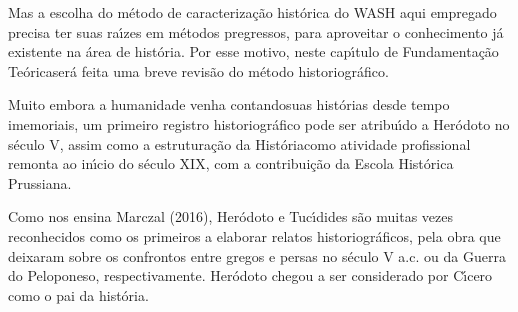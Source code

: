 \documentclass[
12pt,		%
openright,	%
twoside,  %
a4paper,			%
chapter=TITLE,		%
english,			%
french,				%
spanish,			%
brazil				%
]{USPSC-classe/USPSC}
\begin{document}
Mas a escolha do m\'etodo de caracteriza\c{c}\~ao hist\'orica do WASH aqui empregado precisa ter suas ra\'{\i}zes em m\'etodos pregressos, para aproveitar o conhecimento j\'a existente na \'area de hist\'oria. Por esse motivo, neste cap\'{\i}tulo de \textquotedbl Fundamenta\c{c}\~ao Te\'orica\textquotedbl  ser\'a feita uma breve revis\~ao do m\'etodo historiogr\'afico.


Muito embora a humanidade venha \textquotedbl contando\textquotedbl  suas hist\'orias desde tempo imemoriais, um primeiro registro historiogr\'afico pode ser atribu\'{\i}do a Her\'odoto no s\'eculo V, assim como a estrutura\c{c}\~ao da \textquotedbl Hist\'oria\textquotedbl  como atividade profissional remonta ao in\'{\i}cio do s\'eculo XIX, com a contribui\c{c}\~ao da Escola Hist\'orica Prussiana.


Como nos ensina  Marczal (2016),  Her\'odoto e Tuc\'{\i}dides s\~ao muitas vezes reconhecidos como os primeiros a elaborar relatos historiogr\'aficos, pela obra que deixaram sobre os confrontos entre gregos e persas no s\'eculo V a.c. ou da Guerra do Peloponeso, respectivamente. Her\'odoto chegou a ser considerado por C\'{\i}cero como o \textquotedbl pai da hist\'oria\textquotedbl  [XXX].
\end{document}

